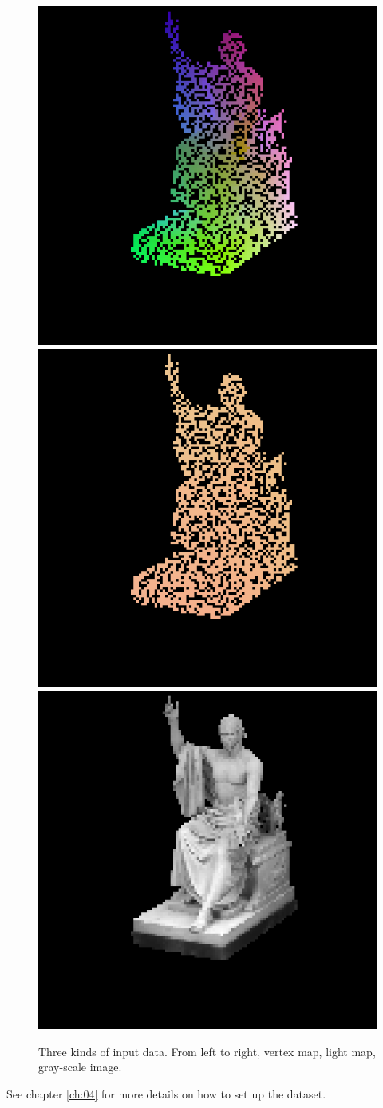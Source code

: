 \begin{figure}[H]
	\centering
	\captionsetup{width=\linewidth}
	{\includegraphics[width=.32\textwidth]{./Figures/intrinsic_image_vertex_input.png}}
	{\includegraphics[width=.32\textwidth]{./Figures/intrinsic_image_light_input.png}}
	{\includegraphics[width=.32\textwidth]{./Figures/intrinsic_image.png}}
	\decoRule
	\caption{Three kinds of input data. From left to right, vertex map, light map, gray-scale image.}
	\label{fig:light-input}
\end{figure}
See chapter \ref{ch:04} for more details on how to set up the dataset.


